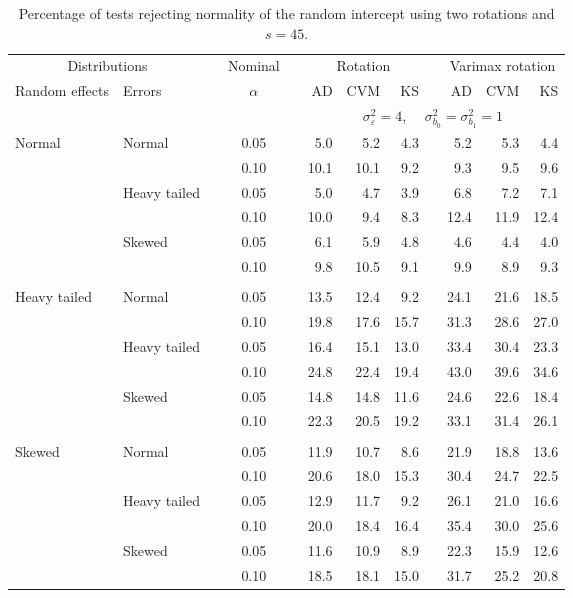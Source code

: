 \begin{table}[ht]
\centering
\caption{\label{tab:fixedsimb045} Percentage of tests rejecting normality of the random intercept using two rotations and $s = 45$.}
\begin{scriptsize}
\begin{tabular}{ll p{.1cm} c p{.1cm} rrr p{.1cm} rrr}
  \hline
  \multicolumn{2}{c}{Distributions}& & Nominal & &  \multicolumn{3}{c}{Rotation} & & \multicolumn{3}{c}{Varimax rotation} \\ \cline{1-2} \cline{6-8} \cline{10-12}   
  Random effects & Errors & & $\alpha$ & & AD & CVM & KS & & AD & CVM & KS \\ 
   \hline
& && && \multicolumn{7}{c}{$\sigma_{\varepsilon}^2 = 4$, \ \ $\sigma_{b_0}^2 = \sigma_{b_1}^2 = 1$} \\ \cline{6-12}
\rowcolor{gray!20} Normal & Normal &  & 0.05 &  & 5.0 & 5.2 & 4.3 &  & 5.2 & 5.3 & 4.4 \\ 
\rowcolor{gray!20}    &  &  & 0.10 &  & 10.1 & 10.1 & 9.2 &  & 9.3 & 9.5 & 9.6 \\ 
\rowcolor{gray!20}    & Heavy tailed &  & 0.05 &  & 5.0 & 4.7 & 3.9 &  & 6.8 & 7.2 & 7.1 \\ 
\rowcolor{gray!20}    &  &  & 0.10 &  & 10.0 & 9.4 & 8.3 &  & 12.4 & 11.9 & 12.4 \\ 
\rowcolor{gray!20}    & Skewed &  & 0.05 &  & 6.1 & 5.9 & 4.8 &  & 4.6 & 4.4 & 4.0 \\ 
\rowcolor{gray!20}    &  &  & 0.10 &  & 9.8 & 10.5 & 9.1 &  & 9.9 & 8.9 & 9.3 \\ 
&&&&&&&&&&&\\
  Heavy tailed & Normal &  & 0.05 &  & 13.5 & 12.4 & 9.2 &  & 24.1 & 21.6 & 18.5 \\ 
   &  &  & 0.10 &  & 19.8 & 17.6 & 15.7 &  & 31.3 & 28.6 & 27.0 \\ 
   & Heavy tailed &  & 0.05 &  & 16.4 & 15.1 & 13.0 &  & 33.4 & 30.4 & 23.3 \\ 
   &  &  & 0.10 &  & 24.8 & 22.4 & 19.4 &  & 43.0 & 39.6 & 34.6 \\ 
   & Skewed &  & 0.05 &  & 14.8 & 14.8 & 11.6 &  & 24.6 & 22.6 & 18.4 \\ 
   &  &  & 0.10 &  & 22.3 & 20.5 & 19.2 &  & 33.1 & 31.4 & 26.1 \\ 
&&&&&&&&&&&\\
  Skewed & Normal &  & 0.05 &  & 11.9 & 10.7 & 8.6 &  & 21.9 & 18.8 & 13.6 \\ 
   &  &  & 0.10 &  & 20.6 & 18.0 & 15.3 &  & 30.4 & 24.7 & 22.5 \\ 
   & Heavy tailed &  & 0.05 &  & 12.9 & 11.7 & 9.2 &  & 26.1 & 21.0 & 16.6 \\ 
   &  &  & 0.10 &  & 20.0 & 18.4 & 16.4 &  & 35.4 & 30.0 & 25.6 \\ 
   & Skewed &  & 0.05 &  & 11.6 & 10.9 & 8.9 &  & 22.3 & 15.9 & 12.6 \\ 
   &  &  & 0.10 &  & 18.5 & 18.1 & 15.0 &  & 31.7 & 25.2 & 20.8 \\ 


\end{tabular}
\end{scriptsize}
\end{table}
